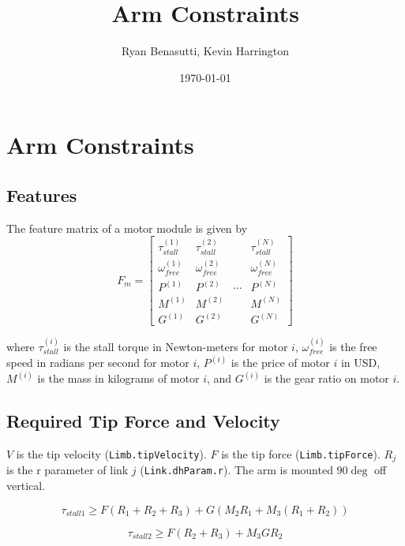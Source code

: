 \documentclass{article}
\title{Arm Constraints}
\author{Ryan Benasutti, Kevin Harrington}
\date{\today}
\begin{document}
\maketitle

\FloatBarrier
\section{Arm Constraints}

\FloatBarrier
\subsection{Features}

The feature matrix of a motor module is given by
\begin{equation}
    F_m =
    \begin{bmatrix}
        \tau_{stall}^{(1)} & \tau_{stall}^{(2)} & & \tau_{stall}^{(N)} \\[6pt]
        \omega_{free}^{(1)} & \omega_{free}^{(2)} & & \omega_{free}^{(N)} \\[6pt]
        P^{(1)} & P^{(2)} & \cdots & P^{(N)} \\[6pt]
        M^{(1)} & M^{(2)} & & M^{(N)} \\[6pt]
        G^{(1)} & G^{(2)} & & G^{(N)}
    \end{bmatrix}
\end{equation}

where $\tau_{stall}^{(i)}$ is the stall torque in Newton-meters for motor $i$,
$\omega_{free}^{(i)}$ is the free speed in radians per second for motor $i$,
$P^{(i)}$ is the price of motor $i$ in USD, $M^{(i)}$ is the mass in kilograms
of motor $i$, and $G^{(i)}$ is the gear ratio on motor $i$.

\FloatBarrier
\subsection{Required Tip Force and Velocity}

$V$ is the tip velocity (\texttt{Limb.tipVelocity}). $F$ is the tip force
(\texttt{Limb.tipForce}). $R_j$ is the r parameter of link $j$
(\texttt{Link.dhParam.r}). The arm is mounted $90 \deg$ off vertical.

\begin{equation}
    \tau_{stall 1} \geq F(R_1 + R_2 + R_3) + G(M_2 R_1 + M_3 (R_1 + R_2))
\end{equation}

\begin{equation}
    \tau_{stall 2} \geq F(R_2 + R_3) + M_3 G R_2
\end{equation}
\end{document}
